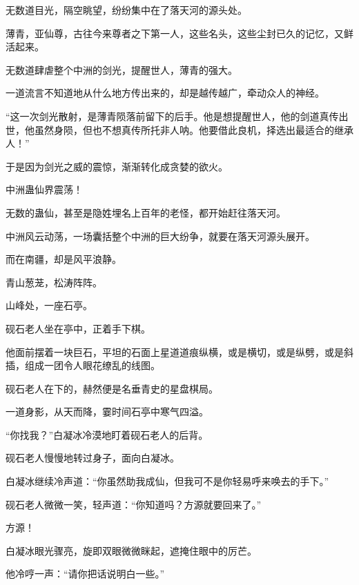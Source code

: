 \begin{this_body}
无数道目光，隔空眺望，纷纷集中在了落天河的源头处。

薄青，亚仙尊，古往今来尊者之下第一人，这些名头，这些尘封已久的记忆，又鲜活起来。

无数道肆虐整个中洲的剑光，提醒世人，薄青的强大。

一道流言不知道地从什么地方传出来的，却是越传越广，牵动众人的神经。

“这一次剑光散射，是薄青陨落前留下的后手。他是想提醒世人，他的剑道真传出世，他虽然身陨，但也不想真传所托非人呐。他要借此良机，择选出最适合的继承人！”

于是因为剑光之威的震惊，渐渐转化成贪婪的欲火。

中洲蛊仙界震荡！

无数的蛊仙，甚至是隐姓埋名上百年的老怪，都开始赶往落天河。

中洲风云动荡，一场囊括整个中洲的巨大纷争，就要在落天河源头展开。

而在南疆，却是风平浪静。

青山葱茏，松涛阵阵。

山峰处，一座石亭。

砚石老人坐在亭中，正着手下棋。

他面前摆着一块巨石，平坦的石面上星道道痕纵横，或是横切，或是纵劈，或是斜插，组成一团令人眼花缭乱的线图。

砚石老人在下的，赫然便是名垂青史的星盘棋局。

一道身影，从天而降，霎时间石亭中寒气四溢。

“你找我？”白凝冰冷漠地盯着砚石老人的后背。

砚石老人慢慢地转过身子，面向白凝冰。

白凝冰继续冷声道：“你虽然助我成仙，但我可不是你轻易呼来唤去的手下。”

砚石老人微微一笑，轻声道：“你知道吗？方源就要回来了。”

方源！

白凝冰眼光骤亮，旋即双眼微微眯起，遮掩住眼中的厉芒。

他冷哼一声：“请你把话说明白一些。”

\end{this_body}

